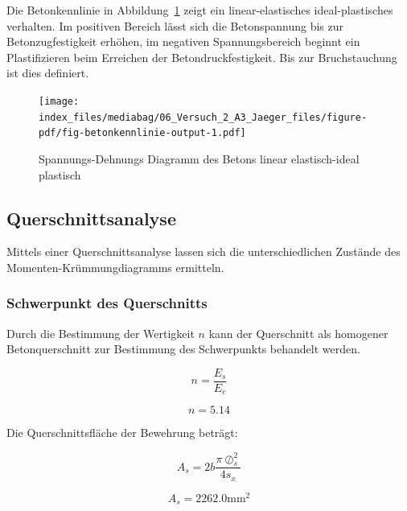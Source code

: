 \documentclass[
  letterpaper,
]{scrreprt}
\begin{document}
Die Betonkennlinie in Abbildung~\ref{fig-betonkennlinie} zeigt ein
linear-elastisches ideal-plastisches verhalten. Im positiven Bereich
lässt sich die Betonspannung bis zur Betonzugfestigkeit erhöhen, im
negativen Spannungsbereich beginnt ein Plastifizieren beim Erreichen der
Betondruckfestigkeit. Bis zur Bruchstauchung ist dies definiert.

\begin{figure}[H]

{\centering \texttt{[image: index\_files/mediabag/06\_Versuch\_2\_A3\_Jaeger\_files/figure-pdf/fig-betonkennlinie-output-1.pdf]}

}

\caption{\label{fig-betonkennlinie}Spannungs-Dehnungs Diagramm des
Betons linear elastisch-ideal plastisch}

\end{figure}

\hypertarget{querschnittsanalyse}{%
\subsection{Querschnittsanalyse}\label{querschnittsanalyse}}

Mittels einer Querschnittsanalyse lassen sich die unterschiedlichen
Zustände des Momenten-Krümmungdiagramms ermitteln.

\hypertarget{schwerpunkt-des-querschnitts}{%
\subsubsection{Schwerpunkt des
Querschnitts}\label{schwerpunkt-des-querschnitts}}

Durch die Bestimmung der Wertigkeit \(n\) kann der Querschnitt als
homogener Betonquerschnitt zur Bestimmung des Schwerpunkts behandelt
werden.

\begin{equation}n = \frac{E_{s}}{E_{c}}\end{equation}

\begin{equation}n = 5.14\end{equation}

Die Querschnittsfläche der Bewehrung beträgt:

\begin{equation}A_{s} = 2 b \frac{\pi \oslash_{s}^{2}}{4 s_{x}}\end{equation}

\begin{equation}A_{s} = 2262.0 \text{mm}^{2}\end{equation}
\end{document}
